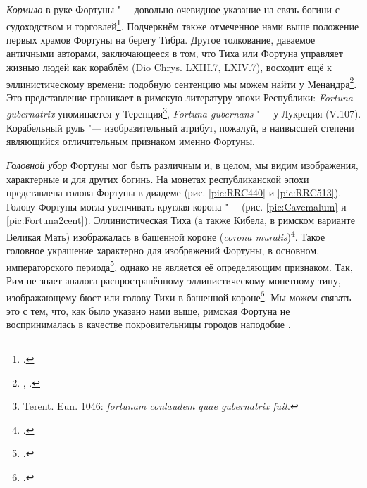 \textit{Кормило} в руке Фортуны "--- довольно очевидное указание на связь богини с судоходством и торговлей\footcite[P. 77]{Arya2002}. Подчеркнём также отмеченное нами выше положение первых храмов Фортуны на берегу Тибра. Другое толкование, даваемое античными авторами, заключающееся в том, что Тиха или Фортуна управляет жизнью людей как кораблём (Dio Chrys. LXIII.7, LXIV.7), восходит ещё к эллинистическому времени: подобную сентенцию мы можем найти у Менандра\footnote{, \cite[P. 213, fr. III.a, 10]{FCG_IV_1841}.}. Это представление проникает в римскую литературу эпохи Республики: \textit{Fortuna gubernatrix} упоминается у Теренция\footnote{Terent. Eun. 1046: \textit{fortunam conlaudem quae gubernatrix fuit}.}, \textit{Fortuna gubernans} "--- у Лукреция (V.107). Корабельный руль "--- изобразительный атрибут, пожалуй, в наивысшей степени являющийся отличительным признаком именно Фортуны.



\textit{Головной убор} Фортуны мог быть различным и, в целом, мы видим изображения, характерные и для других богинь. На монетах республиканской эпохи представлена голова Фортуны в диадеме (рис. \ref{pic:RRC440} и \ref{pic:RRC513}). Голову Фортуны могла увенчивать круглая корона "---  (рис. \ref{pic:Cavemalum} и \ref{pic:Fortuna2cent}). Эллинистическая Тиха (а также Кибела, в римском варианте Великая Мать) изображалась в башенной короне (\textit{corona muralis})\footcite[P. 5]{Arya2002}. Такое головное украшение характерно для изображений Фортуны, в основном, императорского периода\footcite[P. 76]{Arya2002}, однако не является её определяющим признаком. Так, Рим не знает аналога распространённому эллинистическому монетному типу, изображающему бюст или голову Тихи в башенной короне\footcite[Sp. 1370]{Tyche1915Wasser}. Мы можем связать это с тем, что, как было указано нами выше, римская Фортуна не воспринималась в качестве покровительницы городов наподобие .


